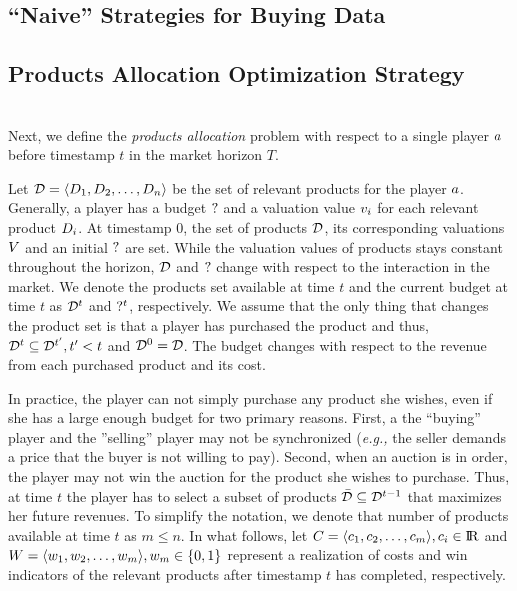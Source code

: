 
\subsection{``Naive'' Strategies for Buying Data}

\subsection{Products Allocation Optimization Strategy}
\\
Next, we define the \emph{products allocation} problem with respect to a single player $a$ before timestamp $t$ in the market horizon $T$.

Let $\mathcal{D} = \langle D_1, D_2, \dots, D_n\rangle$ be the set of relevant products for the player $a$. Generally, a player has a budget $?$ and a valuation value $v_i$ for each relevant product $D_i$. At timestamp $0$, the set of products $\mathcal{D}$, its corresponding valuations $V$ and an initial $?$ are set. While the valuation values of products stays constant throughout the horizon, $\mathcal{D}$ and $?$ change with respect to the interaction in the market. We denote the products set available at time $t$ and the current budget at time $t$ as $\mathcal{D}^{t}$ and $?^{t}$, respectively. We assume that the only thing that changes the product set is that a player has purchased the product and thus, $\mathcal{D}^{t} \subseteq \mathcal{D}^{t^{\prime}}, t^{\prime}<t$ and $\mathcal{D}^{0} = \mathcal{D}$. The budget changes with respect to the revenue from each purchased product and its cost.  

In practice, the player can not simply purchase any product she wishes, even if she has a large enough budget for two primary reasons. First, a the ``buying'' player and the ''selling'' player may not be synchronized (\emph{e.g.,} the seller demands a price that the buyer is not willing to pay). Second, when an auction is in order, the player may not win the auction for the product she wishes to purchase. Thus, at time $t$ the player has to select a subset of products $\bar{\mathcal{D}} \subseteq \mathcal{D}^{t-1}$ that maximizes her future revenues. To simplify the notation, we denote that number of products available at time $t$ as $m\leq n$. In what follows, let $C = \langle c_1, c_2, \dots, c_{m}\rangle, c_i\in {\rm I\!R}$ and $W = \langle w_1, w_2, \dots, w_m\rangle, w_{m}\in \{0,1\}$ represent a realization of costs and win indicators of the relevant products after timestamp $t$ has completed, respectively.

